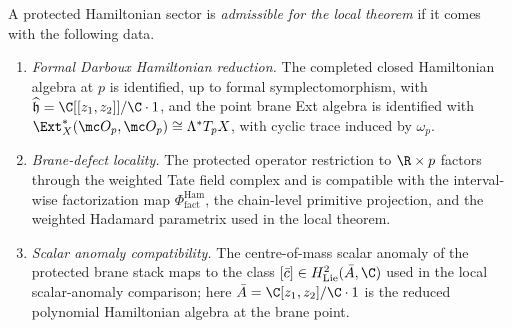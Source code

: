 \begin{defn}\label{defn:admissible-protected-hamiltonian-restriction}
  A protected Hamiltonian sector is \emph{admissible for the local
  theorem} if it comes with the following data.
  \begin{enumerate}[label=(\roman*)]
    \item \emph{Formal Darboux Hamiltonian reduction.}  The completed
      closed Hamiltonian algebra at $p$ is identified, up to formal
      symplectomorphism, with
      $\widehat{\mathfrak h}=\C[[z_1,z_2]]/\C\cdot 1$, and the point
      brane Ext algebra is identified with
      $\Ext_X^*(\mc O_p,\mc O_p)\cong\Lambda^*T_pX$, with cyclic trace
      induced by $\omega_p$.
    \item \emph{Brane-defect locality.}  The protected operator
      restriction to $\R\times p$ factors through the weighted Tate
      field complex and is compatible with the interval-wise
      factorization map
      $\Phi^{\mathrm{Ham}}_{\mathrm{fact}}$, the chain-level
      primitive projection, and the weighted Hadamard parametrix used
      in the local theorem.
    \item \emph{Scalar anomaly compatibility.}  The centre-of-mass
      scalar anomaly of the protected brane stack maps to the class
      $[\bar c]\in H^2_{\mathrm{Lie}}(\bar A,\C)$ used in the local
      scalar-anomaly comparison; here
      $\bar A=\C[z_1,z_2]/\C\cdot 1$ is the reduced
      polynomial Hamiltonian algebra at the brane point.
  \end{enumerate}
\end{defn}

